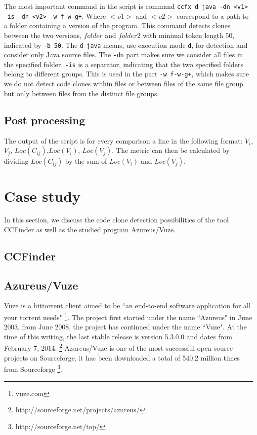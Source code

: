 \documentclass[a4paper,twoside, twocolumn, 11pt]{article}
\numberwithin{equation}{section}
\begin{document}
The most important command in the script is command \texttt{ccfx d java -dn <v1> -is -dn <v2> -w f-w-g+}. 
Where $<v1>$ and $<v2>$ correspond to a path to a folder containing a version of the program.
This command detects clones between the two versions, $folder$ and $folder2$ with minimal token length 50, indicated by \texttt{-b 50}.
The \texttt{d java} means, use execution mode \texttt{d}, for detection and consider only Java source files.
The \texttt{-dn} part makes sure we consider all files in the specified folder.
\texttt{-is} is a separator, indicating that the two specified folders belong to different groups. 
This is used in the part \texttt{-w f-w-g+}, which makes sure we do not detect code clones within files or between files of the same file group but only between files from the distinct file groups.

\subsection{Post processing}
The output of the script is for every comparison a line in the following format: $V_i$, $V_j$, $Loc(C_{ij})$,$ Loc(V_i)$, $Loc(V_j)$.
The metric can then be calculated by dividing $Loc(C_{ij})$ by the sum of $ Loc(V_i)$ and $Loc(V_j)$.


\section{Case study}
In this section, we discuss the code clone detection possibilities of the tool CCFinder as well as the studied program Azureus/Vuze.

\subsection{CCFinder}


\subsection{Azureus/Vuze}
Vuze is a bittorrent client aimed to be ``an end-to-end software application for all your torrent needs" \footnote{vuze.com}.
The project first started under the name ``Azureus" in June 2003, from June 2008, the project has continued under the name ``Vuze".
At the time of this writing, the last stable release is version 5.3.0.0 and dates from February 7, 2014. \footnote{http://sourceforge.net/projects/azureus/}
Azureus/Vuze is one of the most successful open source projects on Sourceforge, it has been downloaded a total of 540.2 million times from Sourceforge \footnote{http://sourceforge.net/top/}.
\end{document}
